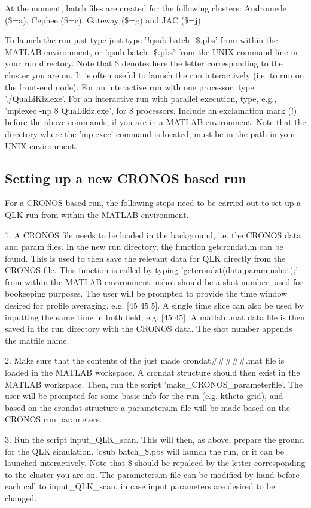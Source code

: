 \documentclass{article}
\begin{document}
At the moment, batch files are created for the following clusters: Andromede (\$=a), Cephee (\$=c), Gateway (\$=g) and JAC (\$=j)

To launch the run just type just type '!qsub batch\_\$.pbs' from within the MATLAB environment, or 'qsub batch\_\$.pbs' from the UNIX command line in your run directory. Note that \$ denotes here the letter corresponding to the cluster you are on. It is often useful to launch the run interactively (i.e. to run on the front-end node). For an interactive run with one processor, type './QuaLiKiz.exe'. For an interactive run with parallel execution, type, e.g., 'mpiexec -np 8 QuaLikiz.exe', for 8 processors. Include an exclamation mark (!) before the above commands, if you are in a MATLAB environment. Note that the directory where the 'mpiexec' command is located, must be in the path in your UNIX environment.

\subsection{Setting up a new CRONOS based run}

For a CRONOS based run, the following steps need to be carried out to set up a QLK run from within the MATLAB environment.

1. A CRONOS file needs to be loaded in the background, i.e. the CRONOS data and param files. In the new run directory, the function 
getcrondat.m can be found. This is used to then save the relevant data for QLK directly from the CRONOS file. This function is called 
by typing 'getcrondat(data,param,nshot);' from within the MATLAB environment. nshot should be a shot number, used for bookeeping 
purposes. The user will be prompted to provide the time window desired for profile averaging, e.g. [45 45.5]. A single time slice 
can also be used by inputting the same time in both field, e.g. [45 45]. A matlab .mat data file is then saved in the run directory 
with the CRONOS data. The shot number appends the matfile name.

2. Make sure that the contents of the just made crondat\#\#\#\#\#.mat file is loaded in the MATLAB workspace. A crondat structure should then exist in the MATLAB workspace. Then, run the script 'make\_CRONOS\_parameterfile'. The user will be prompted for
some basic info for the run (e.g. ktheta grid), and based on the crondat structure a parameters.m file will be made based on the CRONOS run parameters. 

3. Run the script input\_QLK\_scan. This will then, as above, prepare the ground for the QLK simulation. !qsub batch\_\$.pbs will launch the run, or it can be launched interactively. Note that \$ should be repalced by the letter corresponding to the cluster you are on.
The parameters.m file can be modified by hand before each call to input\_QLK\_scan, in case input parameters are desired to be changed.
\end{document}
